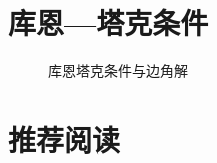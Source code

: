\section{库恩—塔克条件}
\label{sec:Kuhn-Tucker-theorem}


\begin{figure}[!h]
\colorbox{black!3}{\parbox{\linewidth-2\fboxsep}{%
\centering

\caption{库恩塔克条件与边角解}
\label{fig:kuhn-tucker-theorem-and-corner-solution}
}}
\end{figure}



\section*{推荐阅读}


